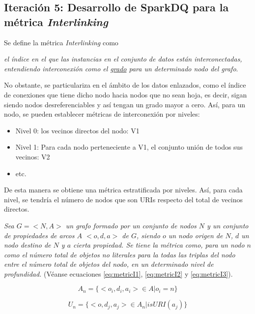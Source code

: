\subsection{Iteración 5: Desarrollo de SparkDQ para la métrica \textit{Interlinking}}
\label{iteracion5}


Se define la métrica \textit{Interlinking} como

\textit{el índice en el que las
instancias en el conjunto de datos están interconectadas, entendiendo
interconexión como el \underline{grado} para un determinado nodo del grafo}.

No obstante, se particulariza en el ámbito de los datos enlazados, como el índice de
conexiones que tiene dicho nodo hacia nodos que no sean hoja, es decir, sigan
siendo nodos desreferenciables y así tengan un grado mayor a cero. Así,
para un nodo, se pueden establecer métricas de
interconexión por niveles:

\begin{itemize}
\item Nivel 0: los vecinos directos del nodo: V1 
\item Nivel 1: Para cada nodo perteneciente a V1, el conjunto unión de todos sus
  vecinos: V2
\item etc. 
\end{itemize}

De esta manera se obtiene una métrica estratificada por niveles. Así, para cada nivel, se
tendría el número de nodos que son URIs respecto del total de vecinos directos.

\textit{Sea $G = <N, A>$ un grafo formado por un conjunto de nodos $N$ y un conjunto de
  propiedades de arcos $A$ $<o, d, a>$ de $G$, siendo $o$ un nodo origen de
  $N$, $d$ un nodo destino de $N$ y $a$ cierta propiedad. Se tiene la métrica
  como, para un nodo $n$ como el número total de objetos no literales para la todas las
  triplas del nodo entre el número total de objetos del nodo, en un determinado
  nivel de profundidad.} (Véanse ecuaciones \ref{eq:metricI1}, \ref{eq:metricI2} y \ref{eq:metricI3}).

\begin{equation}
  A_n = \{<o_i,d_i,a_i> \in A |  o_i = n\}
  \label{eq:metricI1}
\end{equation}

\begin{equation}
  U_n = \{<o,d_j,a_j> \in A_n | isURI(a_j) \}
  \label{eq:metricI2}
\end{equation}

